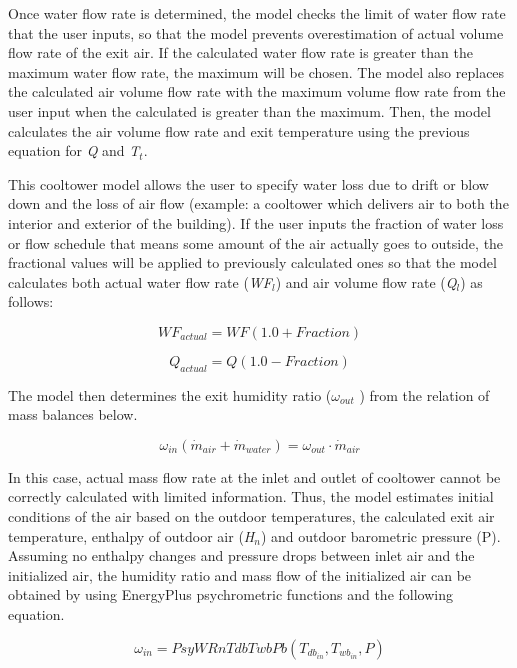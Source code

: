 Once water flow rate is determined, the model checks the limit of water flow rate that the user inputs, so that the model prevents overestimation of actual volume flow rate of the exit air. If the calculated water flow rate is greater than the maximum water flow rate, the maximum will be chosen. The model also replaces the calculated air volume flow rate with the maximum volume flow rate from the user input when the calculated is greater than the maximum. Then, the model calculates the air volume flow rate and exit temperature using the previous equation for \emph{Q} and \emph{T\(_{t}\)}.

This cooltower model allows the user to specify water loss due to drift or blow down and the loss of air flow (example: a cooltower which delivers air to both the interior and exterior of the building). If the user inputs the fraction of water loss or flow schedule that means some amount of the air actually goes to outside, the fractional values will be applied to previously calculated ones so that the model calculates both actual water flow rate (\emph{WF\(_{l}\)}) and air volume flow rate (\emph{Q\(_{l}\)}) as follows:

\begin{equation}
W{F_{actual}} = WF(1.0 + Fraction)
\end{equation}

\begin{equation}
{Q_{actual}} = Q(1.0 - Fraction)
\end{equation}

The model then determines the exit humidity ratio (\({\omega_{out}}\) ) from the relation of mass balances below.

\begin{equation}
{\omega_{in}}({\dot m_{air}} + {\dot m_{water}}) = {\omega_{out}} \cdot {\dot m_{air}}
\end{equation}

In this case, actual mass flow rate at the inlet and outlet of cooltower cannot be correctly calculated with limited information. Thus, the model estimates initial conditions of the air based on the outdoor temperatures, the calculated exit air temperature, enthalpy of outdoor air (\emph{H\(_{n}\)}) and outdoor barometric pressure (P). Assuming no enthalpy changes and pressure drops between inlet air and the initialized air, the humidity ratio and mass flow of the initialized air can be obtained by using EnergyPlus psychrometric functions and the following equation.

\begin{equation}
{\omega_{in}} = PsyWRnTdbTwbPb({T_{d{b_{in}}}},{T_{w{b_{in}}}},P)
\end{equation}

